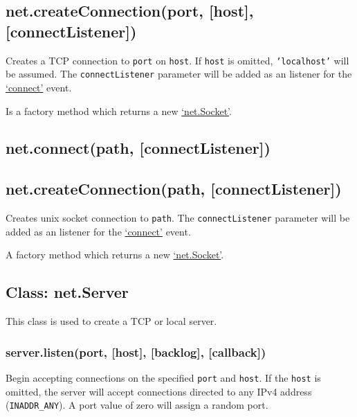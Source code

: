 \subsection{net.createConnection(port, {[}host{]},
{[}connectListener{]})}\label{net.createconnectionport-host-connectlistener}

Creates a TCP connection to \texttt{port} on \texttt{host}. If
\texttt{host} is omitted, \texttt{'localhost'} will be assumed. The
\texttt{connectListener} parameter will be added as an listener for the
\hyperref[netux5feventux5fconnect]{`connect'} event.

Is a factory method which returns a new
\hyperref[netux5fclassux5fnetux5fsocket]{`net.Socket'}.

\subsection{net.connect(path,
{[}connectListener{]})}\label{net.connectpath-connectlistener}

\subsection{net.createConnection(path,
{[}connectListener{]})}\label{net.createconnectionpath-connectlistener}

Creates unix socket connection to \texttt{path}. The
\texttt{connectListener} parameter will be added as an listener for the
\hyperref[netux5feventux5fconnect]{`connect'} event.

A factory method which returns a new
\hyperref[netux5fclassux5fnetux5fsocket]{`net.Socket'}.

\subsection{Class: net.Server}\label{class-net.server}

This class is used to create a TCP or local server.

\subsubsection{server.listen(port, {[}host{]}, {[}backlog{]},
{[}callback{]})}\label{server.listenport-host-backlog-callback}

Begin accepting connections on the specified \texttt{port} and
\texttt{host}. If the \texttt{host} is omitted, the server will accept
connections directed to any IPv4 address (\texttt{INADDR\_ANY}). A port
value of zero will assign a random port.

